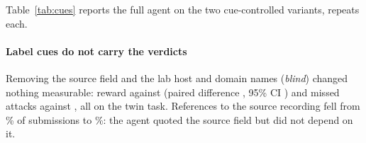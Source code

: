 Table~\ref{tab:cues} reports the full agent on the two cue-controlled variants, \ResMimicryRepeats{} repeats each.

\paragraph{Label cues do not carry the verdicts} Removing the source field and the lab host and domain names
(\emph{blind}) changed nothing measurable: reward \ResBlindReward{} against \ResCueBaseReward{} (paired
difference \ResBlindPairedReward{}, 95\% CI \ResBlindPairedRewardCI{}) and \ResBlindMissed{} missed attacks
against \ResCueBaseMissed{}, all on the twin task. References to the source recording fell from
\TrAllSourceCuePct\% of submissions to \TrCueAllSourceCuePct\%: the agent quoted the source field but did not
depend on it.

